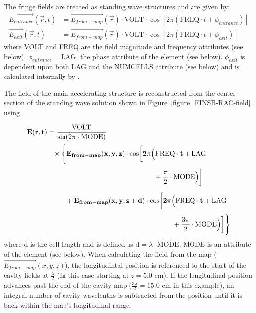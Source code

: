 The fringe fields are treated as standing wave structures and are given by:
\begin{equation*}
  \begin{aligned}
    \vec{E_{entrance}}(\vec{r}, t) &= \vec{E_{from-map}}(\vec{r}) \cdot \text{VOLT} \cdot \cos \left[ 2\pi \left( \text{FREQ} \cdot t
        + \phi_{entrance} \right) \right] \\
    \vec{E_{exit}}(\vec{r}, t) &= \vec{E_{from-map}}(\vec{r}) \cdot \text{VOLT} \cdot \cos \left[ 2\pi \left( \text{FREQ} \cdot t
        + \phi_{exit} \right) \right]
  \end{aligned}
\end{equation*}
where VOLT and FREQ are the field magnitude and frequency attributes (see below). 
$ \phi_{entrance}= \text{LAG}$, the phase attribute of the element (see below). $ \phi_{exit} $ is dependent upon both LAG and the NUMCELLS
attribute (see below) and is calculated internally by \opalt.

The field of the main accelerating structure is reconstructed from the center section of the standing wave solution shown in
Figure~\ref{figure_FINSB-RAC-field} using

\begin{equation*}
  \begin{split}
    \vec{E} ( \vec{r},t ) &= \frac{\text{VOLT}}{\sin (2 \pi \cdot \text{MODE})} \\
    &\phantom{=}
    \times \Biggl\{ \vec{E_{from-map}} (x,y,z) \cdot \cos \biggl[ 2 \pi \Bigl( \text{FREQ} \cdot t + \text{LAG} \\
    &\phantom{= \times \Biggl\{ \vec{E_{from-map}} (x,y,z) \cdot \cos \biggl[ 2 \pi \Bigl(}
    + \frac{\pi}{2} \cdot \text{MODE} \Bigr) \biggr] \\
    &\phantom{= \times \Biggl\{}
    + \vec{E_{from-map}}(x,y,z+d) \cdot \cos \biggl[ 2 \pi \Bigl( \text{FREQ} \cdot t + \text{LAG} \\
    &\phantom{= \times \Biggl\{ + \vec{E_{from-map}} (x,y,z+d) \cdot \cos \biggl[ 2 \pi \Bigl(}
    + \frac{3 \pi}{2} \cdot \text{MODE} \Bigr) \biggr] \Biggr\}
  \end{split}
\end{equation*}
where d is the cell length and is defined as $\text{d} = \lambda \cdot \text{MODE} $. MODE is an attribute of the element (see below).
When calculating the field from the map ($\vec{E_{from-map}}(x,y,z)$), the longitudintal position is referenced to the start of the cavity fields
at $\frac{\lambda}{2}$ (In this case starting at $z = 5.0 \text{ cm}$). If the longitudinal position advances past the end of the cavity map
($\frac{3\lambda}{2} = 15.0 \text{ cm}$ in this example), an integral number of cavity wavelenths is subtracted from the position until it is back
within the map's longitudinal range.

